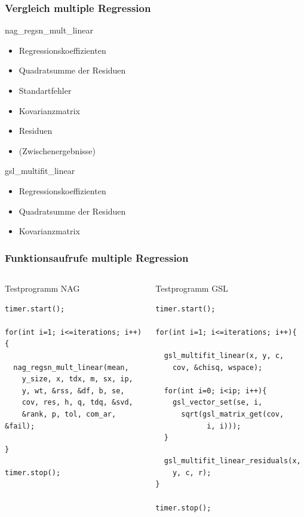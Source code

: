 \documentclass{beamer}
\begin{document}
\begin{frame}
  \frametitle{Vergleich multiple Regression}
  
  \begin{block}{nag\_regsn\_mult\_linear}
    \begin{itemize}
    \item Regressionskoeffizienten
    \item Quadratsumme der Residuen
    \item Standartfehler
    \item Kovarianzmatrix
    \item Residuen
    \item (Zwischenergebnisse)
    \end{itemize}
  \end{block}
  
  \begin{block}{gsl\_multifit\_linear}
    \begin{itemize}
    \item Regressionskoeffizienten
    \item Quadratsumme der Residuen
    \item Kovarianzmatrix
    \end{itemize}
  \end{block}

\end{frame}

\begin{frame}[fragile]
  \frametitle{Funktionsaufrufe multiple Regression}
  
  \begin{columns}
    \begin{block}{Testprogramm NAG}
      \begin{lstlisting}
timer.start();

for(int i=1; i<=iterations; i++){
  
  nag_regsn_mult_linear(mean, 
    y_size, x, tdx, m, sx, ip, 
    y, wt, &rss, &df, b, se,
    cov, res, h, q, tdq, &svd, 
    &rank, p, tol, com_ar, &fail);

}

timer.stop();
      \end{lstlisting}
    \end{block}
    \begin{block}{Testprogramm GSL}
      \begin{lstlisting}
timer.start();

for(int i=1; i<=iterations; i++){    
  
  gsl_multifit_linear(x, y, c, 
    cov, &chisq, wspace);
  
  for(int i=0; i<ip; i++){
    gsl_vector_set(se, i, 
      sqrt(gsl_matrix_get(cov, 
            i, i)));
  }
    
  gsl_multifit_linear_residuals(x, 
    y, c, r);
}

timer.stop();
\end{lstlisting}
\end{block}    
\end{columns}

\end{frame}
\end{document}
